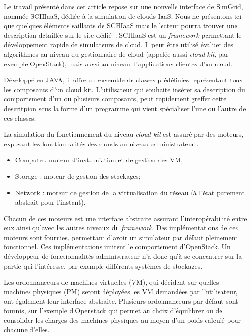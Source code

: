 \documentclass[parallelisme]{compas2017}
\begin{document}
Le  travail présenté  dans  cet article  repose sur  une  nouvelle interface  de
SimGrid,  nommée SCHIaaS,  dédiée  à  la simulation  de  clouds  IaaS.  Nous  ne
présentons ici que quelques éléments saillants de SCHIaaS mais le lecteur pourra
trouver  une  description  détaillée  sur  le  site  dédié~\cite{schiaas-gforge}.
SCHIaaS  est  un  \textit{framework}   permettant  le  développement  rapide  de
simulateurs de cloud. Il peut être utilisé évaluer des algorithmes au niveau du 
gestionnaire de cloud (appelée aussi \textit{cloud-kit},  par exemple
OpenStack), mais aussi au niveau d'applications clientes d'un cloud.

Développé en JAVA, il offre un ensemble de classes prédéfinies représentant tous
les composants d'un cloud kit. L'utilisateur qui souhaite insérer sa description
du  comportement d'un  ou plusieurs  composants, peut  rapidement greffer  cette
descritpion sous la forme d'un programme  qui vient spécialiser l'une ou l'autre
de ces classes.

La simulation du fonctionnement du  niveau \textit{cloud-kit} est assuré par des
moteurs, exposant les fonctionnalités des clouds au niveau administrateur :
\begin{itemize}
 \item Compute : moteur d'instanciation et de gestion des VM;
 \item Storage : moteur de gestion des stockages;
 \item Network : moteur de gestion de la virtualisation du réseau (à l'état purement abstrait pour l'instant).
\end{itemize}

Chacun de  ces moteurs est  une interface abstraite  assurant l'interopérabilité
entre  eux  ainsi  qu'avec  les   autres  niveaux  du  \textit{framework}.   Des
implémentations de ces  moteurs sont fournies, permettant  d'avoir un simulateur
par défaut pleinement fonctionnel.   Ces implémentations imitent le comportement
d'OpenStack. Un développeur  de fonctionnalités administrateur n'a  donc qu'à se
concentrer sur  la partie  qui l'intéresse, par  exemple différents  systèmes de
stockages.

Les ordonnanceurs de machines virtuelles (VM), qui décident sur quelles machines
physiques  (PM)  seront  déployées  les  VM  demandées  par  l'utilisateur,  ont
également  leur interface  abstraite.  Plusieurs ordonnanceurs  par défaut  sont
fournis,  sur l'exemple  d'Openstack  qui  permet au  choix  d'équilibrer ou  de
consolider les charges  des machines physiques au moyen d'un  poids calculé pour
chacune d'elles.
\end{document}

